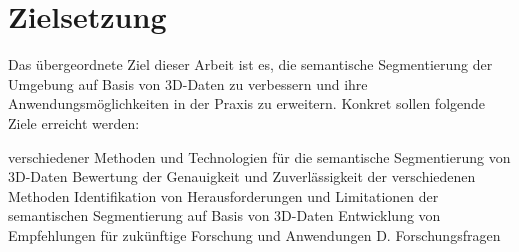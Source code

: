 \section{Zielsetzung}

Das übergeordnete Ziel dieser Arbeit ist es, die semantische Segmentierung der
Umgebung auf Basis von 3D-Daten zu verbessern und ihre Anwendungsmöglichkeiten
in der Praxis zu erweitern. Konkret sollen folgende Ziele erreicht werden:

verschiedener Methoden und Technologien für die semantische Segmentierung von
3D-Daten Bewertung der Genauigkeit und Zuverlässigkeit der verschiedenen
Methoden Identifikation von Herausforderungen und Limitationen der semantischen
Segmentierung auf Basis von 3D-Daten Entwicklung von Empfehlungen für
zukünftige Forschung und Anwendungen D. Forschungsfragen